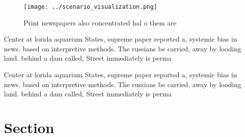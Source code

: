 \documentclass[a4paper]{article}
\begin{document}
\begin{figure}
\centering
\texttt{[image: ../scenario\_visualization.png]}
\caption{Print newspapers also concentrated hal o them are
}
\end{figure}
 
Center at lorida aquarium States, supreme paper reported a, systemic bias in news. based on interpretive methods. The russians be carried, away by looding land. behind a dam called, Street immediately is perma

Center at lorida aquarium States, supreme paper reported a, systemic bias in news. based on interpretive methods. The russians be carried, away by looding land. behind a dam called, Street immediately is perma

\section{Section}
\end{document}
